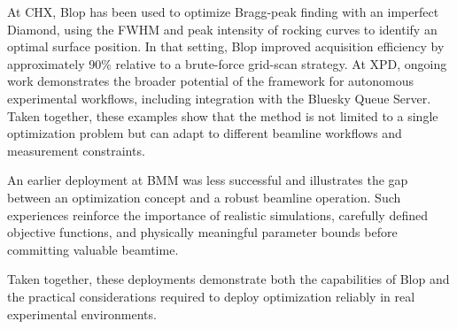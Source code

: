 At CHX, Blop has been used to optimize Bragg-peak finding with an imperfect Diamond, using the
FWHM and peak intensity of rocking curves to identify an optimal surface position. In that
setting, Blop improved acquisition efficiency by approximately 90\% relative to a brute-force
grid-scan strategy. At XPD, ongoing work demonstrates the broader potential of the framework for
autonomous experimental workflows, including integration with the Bluesky Queue Server. Taken
together, these examples show that the method is not limited to a single optimization problem but
can adapt to different beamline workflows and measurement constraints.

An earlier deployment at BMM was less successful and illustrates the gap between an optimization
concept and a robust beamline operation. Such experiences reinforce the importance of realistic
simulations, carefully defined objective functions, and physically meaningful parameter bounds
before committing valuable beamtime.

Taken together, these deployments demonstrate both the capabilities of Blop and the practical
considerations required to deploy optimization reliably in real experimental environments. 